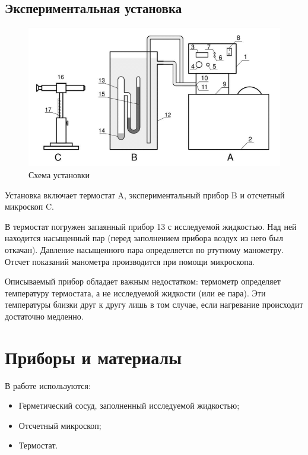 \documentclass[12pt]{article}
\begin{document}
\subsection*{Экспериментальная установка}

\begin{figure}[H]
	\centering
	\includegraphics[scale = 0.5]{./images/stand.png}
	\caption{Схема установки}
	\label{fig:stand}
\end{figure}

Установка включает термостат A, экспериментальный прибор B
и отсчетный микроскоп C.

В термостат погружен запаянный прибор 13 с исследуемой жидкостью. Над ней находится насыщенный пар (перед заполнением прибора воздух из него был откачан). Давление насыщенного пара определяется по ртутному манометру. Отсчет показаний манометра
производится при помощи микроскопа.

Описываемый прибор обладает важным недостатком: термометр определяет температуру термостата, а не исследуемой жидкости (или ее пара). Эти температуры близки друг к другу лишь в том случае, если нагревание происходит достаточно медленно.

\section{Приборы и материалы}

В работе используются:

\begin{itemize}
	\item Герметический сосуд, заполненный исследуемой жидкостью;
	\item Отсчетный микроскоп;
	\item Термостат.
\end{itemize}
\end{document}
